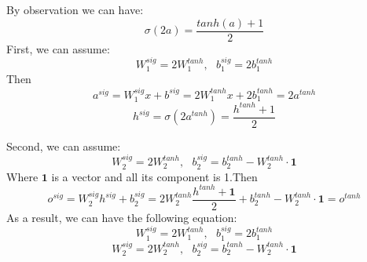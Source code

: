 \documentclass[twoside]{article}
\begin{document}
By observation we can have:
$$\sigma(2a) = \frac{tanh(a)+1}{2}$$
First, we can assume:
$$W_1^{sig} = 2W_1^{tanh},\ \ \ b_1^{sig}=2b_1^{tanh}$$
Then $$a^{sig} = W^{sig}_{1}x + b^{sig} = 2W_1^{tanh}x+2b_1^{tanh} = 2 a^{tanh}$$
$$h^{sig}=\sigma(2 a^{tanh}) = \frac{h^{tanh}+1}{2}$$

Second, we can assume:
$$W_2^{sig} = 2W_2^{tanh},\ \ \ b_2^{sig}=b_2^{tanh}-W_2^{tanh} \cdot \mathbf{1}$$
Where $\mathbf{1}$ is a vector and all its component is 1.Then $$o^{sig} =  W^{sig}_2 h^{sig} + b^{sig}_2=2W_2^{tanh}\frac{h^{tanh}+\mathbf{1}}{2} +b_2^{tanh}-W_2^{tanh} \cdot \mathbf{1}=o^{tanh} $$
As a result, we can have the following equation:
$$W_1^{sig} = 2W_1^{tanh},\ \ \ b_1^{sig}=2b_1^{tanh}$$
$$W_2^{sig} = 2W_2^{tanh},\ \ \ b_2^{sig}=b_2^{tanh}-W_2^{tanh} \cdot \mathbf{1}$$
\end{document}
